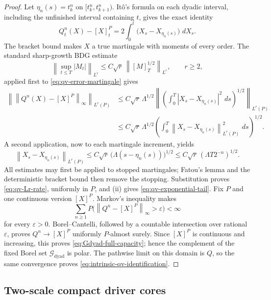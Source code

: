 \documentclass[11pt,reqno]{amsart}
\theoremstyle{plain}
\theoremstyle{definition}
\newcommand{\cG}{\mathcal G}
\newcommand{\eps}{\varepsilon}
\newcommand{\dd}{\,d}
\newcommand{\norm}[1]{\left\lVert #1\right\rVert}
\newcommand{\abs}[1]{\left\lvert #1\right\rvert}
\begin{document}
\begin{proof}
Let \(\eta_n(s)=t_k^n\) on
\([t_k^n,t_{k+1}^n)\).  It\^o's formula on each dyadic interval, including
the unfinished interval containing \(t\), gives the exact identity
\begin{equation}\label{eq:qv-error-martingale}
  Q_t^n(X)-[X]^P_t
  =2\int_0^t\bigl(X_s-X_{\eta_n(s)}\bigr)\,\dd X_s .
\end{equation}
The bracket bound makes \(X\) a true martingale with moments of every order.
The standard sharp-growth BDG estimate \cite{Ren08}
\[
  \left\|\sup_{t\le T}\abs{M_t}\right\|_{L^r}
  \le C\sqrt r\,
     \left\|[M]_T^{1/2}\right\|_{L^r},
  \qquad r\ge2,
\]
applied first to \eqref{eq:qv-error-martingale} gives
\begin{align*}
  \left\|\norm{Q^n(X)-[X]^P}_\infty\right\|_{L^r(P)}
  &\le C\sqrt r\,\Lambda^{1/2}
    \left\|
      \left(\int_0^T
        \abs{X_s-X_{\eta_n(s)}}^2\,\dd s
      \right)^{1/2}
    \right\|_{L^r(P)} \\
  &\le C\sqrt r\,\Lambda^{1/2}
    \left(
      \int_0^T
      \norm{X_s-X_{\eta_n(s)}}_{L^r(P)}^2\,\dd s
    \right)^{1/2}.
\end{align*}
A second application, now to each martingale increment, yields
\[
  \norm{X_s-X_{\eta_n(s)}}_{L^r(P)}
  \le C\sqrt r\,
       \bigl(\Lambda(s-\eta_n(s))\bigr)^{1/2}
  \le C\sqrt r\,(\Lambda T2^{-n})^{1/2}.
\]
All estimates may first be applied to stopped martingales; Fatou's lemma and
the deterministic bracket bound then remove the stopping.  Substitution
proves \eqref{eq:qv-Lr-rate}, uniformly in \(P\), and
(ii) gives \eqref{eq:qv-exponential-tail}.
Fix \(P\) and one continuous version
\([X]^P\).  Markov's inequality makes
\[
  \sum_{n\ge1}
  P\bigl(\norm{Q^n-[X]^P}_\infty>\eps\bigr)
  <\infty
\]
for every \(\eps>0\).  Borel--Cantelli, followed by a countable intersection
over rational \(\eps\), proves \(Q^n\to[X]^P\) uniformly
\(P\)-almost surely.  Since \([X]^P\) is continuous and increasing, this
proves \eqref{eq:Gdyad-full-capacity}; hence the complement of the fixed
Borel set \(\cG_{\mathrm{dyad}}\) is polar.  The pathwise limit on this
domain is \(Q\), so the same convergence proves
\eqref{eq:intrinsic-qv-identification}.
\end{proof}

\subsection{Two-scale compact driver cores}
\end{document}
